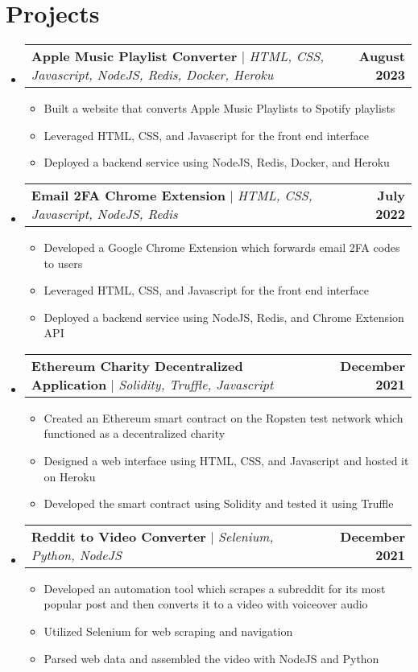 \documentclass[letterpaper,11pt]{article}
\makeatletter
\newcommand{\resumeItem}[1]{
  \item\small{
    {#1 \vspace{-2pt}}
  }
}
\newcommand{\resumeProjectHeading}[2]{
    \item
    \begin{tabular*}{1.001\textwidth}{l@{\extracolsep{\fill}}r}
      \small#1 & \textbf{\small #2}\\
    \end{tabular*}\vspace{-7pt}
}
\newcommand{\resumeSubHeadingListStart}{\begin{itemize}[leftmargin=0.0in, label={}]}
\newcommand{\resumeSubHeadingListEnd}{\end{itemize}}
\newcommand{\resumeItemListStart}{\begin{itemize}}
\newcommand{\resumeItemListEnd}{\end{itemize}\vspace{-5pt}}
\makeatother
\begin{document}
\section{Projects}
    \vspace{-5pt}
    \resumeSubHeadingListStart
      \resumeProjectHeading
          {\textbf{Apple Music Playlist Converter} $|$ \emph{HTML, CSS, Javascript, NodeJS, Redis, Docker, Heroku}}{August 2023}
          \resumeItemListStart
            \resumeItem{Built a website that converts Apple Music Playlists to Spotify playlists}
            \resumeItem{Leveraged HTML, CSS, and Javascript for the front end interface}
            \resumeItem{Deployed a backend service using NodeJS, Redis, Docker, and Heroku}
          \resumeItemListEnd
          \vspace{-13pt}
      \resumeProjectHeading
          {\textbf{Email 2FA Chrome Extension} $|$ \emph{HTML, CSS, Javascript, NodeJS, Redis}}{July 2022}
          \resumeItemListStart
            \resumeItem{Developed a Google Chrome Extension which forwards email 2FA codes to users}
            \resumeItem{Leveraged HTML, CSS, and Javascript for the front end interface}
            \resumeItem{Deployed a backend service using NodeJS, Redis, and Chrome Extension API}
          \resumeItemListEnd
          \vspace{-13pt}
      \resumeProjectHeading
          {\textbf{Ethereum Charity Decentralized Application} $|$ \emph{Solidity, Truffle, Javascript}}{December 2021}
          \resumeItemListStart
            \resumeItem{Created an Ethereum smart contract on the Ropsten test network which functioned as a decentralized charity}
            \resumeItem{Designed a web interface using HTML, CSS, and Javascript and hosted it on Heroku}
            \resumeItem{Developed the smart contract using Solidity and tested it using Truffle}
          \resumeItemListEnd 
          \vspace{-13pt}
          \resumeProjectHeading
          {\textbf{Reddit to Video Converter} $|$ \emph{Selenium, Python, NodeJS}}{December 2021}
          \resumeItemListStart
            \resumeItem{Developed an automation tool which scrapes a subreddit for its most popular post and then converts it to a video with voiceover audio}
            \resumeItem{Utilized Selenium for web scraping and navigation}
            \resumeItem{Parsed web data and assembled the video with NodeJS and Python}
          \resumeItemListEnd 
    \resumeSubHeadingListEnd
\vspace{-15pt}
\end{document}
